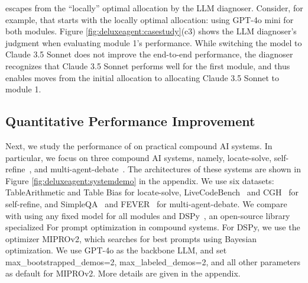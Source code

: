 \deluxesystem{} escapes from the ``locally'' optimal allocation by the LLM diagnoser. Consider, for example, that \deluxesystem{} starts with the locally optimal allocation: using GPT-4o mini for both modules. Figure \ref{fig:deluxeagent:casestudy}(c3) shows the LLM diagnoser's judgment when evaluating module 1's performance. While switching the model to Claude 3.5 Sonnet does not improve the end-to-end performance, the diagnoser recognizes that Claude 3.5 Sonnet performs well for the first module, and thus enables \deluxesystem{} moves from the initial allocation to allocating Claude 3.5 Sonnet to module 1. %

\subsection{Quantitative Performance Improvement}

Next, we study the performance of \deluxesystem{} on practical compound AI systems. In particular, we focus on three compound AI systems, namely, locate-solve, self-refine~\cite{renze2024self}, and multi-agent-debate~\cite{multi_agent_debate_2024}. The architectures of these systems are shown in Figure \ref{fig:deluxeagent:systemdemo} in the appendix. We use six datasets: TableArithmetic and Table Bias for locate-solve, LiveCodeBench~\cite{jain2024livecodebench} and CGH~\cite{renze2024self} for self-refine, and SimpleQA~\cite{wei2024measuring} and FEVER~\cite{Thorne19FEVER2} for multi-agent-debate. We compare \deluxesystem{} with using any fixed model for all modules and  DSPy~\cite{khattab2024dspy}, an open-source library specialized For prompt optimization in compound systems. For DSPy, we use the optimizer MIPROv2, which searches for best prompts using Bayesian optimization. We use GPT-4o as the backbone LLM, and set max\_bootstrapped\_demos=2, max\_labeled\_demos=2, and all other parameters as default for MIPROv2. 
More details are given in the appendix.

